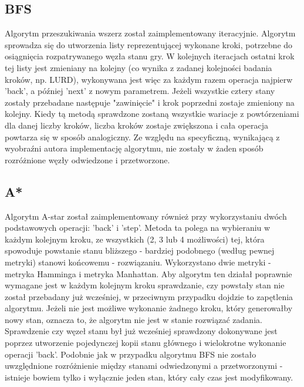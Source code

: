 \documentclass{classrep}
\begin{document}
{        \subsection{BFS} {
            Algorytm przeszukiwania wszerz został zaimplementowany iteracyjnie. Algorytm sprowadza
            się do utworzenia listy reprezentującej wykonane kroki, potrzebne do osiągnięcia
            rozpatrywanego węzła stanu gry. W kolejnych iteracjach ostatni krok tej listy jest
            zmieniany na kolejny (co wynika z zadanej kolejności badania kroków, np. LURD),
            wykonywana jest więc za każdym razem operacja najpierw 'back', a później 'next' z
            nowym parametrem. Jeżeli wszystkie cztery stany zostały przebadane następuje
            "zawinięcie" i krok poprzedni zostaje zmieniony na kolejny. Kiedy tą metodą
            sprawdzone zostaną wszystkie wariacje z powtórzeniami dla danej liczby kroków,
            liczba kroków zostaje zwiększona i cała operacja powtarza się w sposób analogiczny.
            Ze względu na specyficzną, wynikającą z wyobraźni autora implementację algorytmu,
            nie zostały w żaden sposób rozróżnione węzły odwiedzone i przetworzone.
        }

        \subsection{A*} {
            Algorytm A-star został zaimplementowany również przy wykorzystaniu dwóch podstawowych
            operacji: 'back' i 'step'. Metoda ta polega na wybieraniu w każdym kolejnym kroku,
            ze wszystkich (2, 3 lub 4 możliwości) tej, która spowoduje powstanie stanu
            bliższego - bardziej podobnego (według pewnej metryki) stanowi końcowemu - rozwiązaniu.
            Wykorzystano dwie metryki - metryka Hamminga i metryka Manhattan. Aby algorytm ten
            działał poprawnie wymagane jest w każdym kolejnym kroku sprawdzanie, czy powstały stan
            nie został przebadany już wcześniej, w przeciwnym przypadku dojdzie to zapętlenia
            algorytmu. Jeżeli nie jest możliwe wykonanie żadnego kroku, który generowałby nowy
            stan, oznacza to, że algorytm nie jest w stanie rozwiązać zadania. Sprawdzenie czy
            węzeł stanu był już wcześniej sprawdzony dokonywane jest poprzez utworzenie pojedynczej
            kopii stanu głównego i wielokrotne wykonanie operacji 'back'. Podobnie jak w przypadku
            algorytmu BFS nie zostało uwzględnione rozróżnienie między stanami odwiedzonymi
            a przetworzonymi - istnieje bowiem tylko i wyłącznie jeden stan, który cały
            czas jest modyfikowany.
        }
    }
\end{document}
